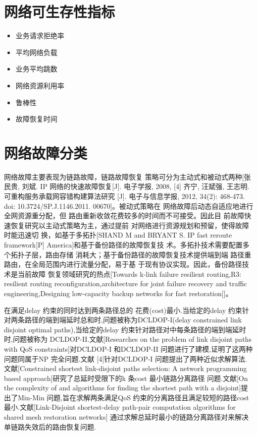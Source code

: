 \section{网络可生存性指标}
\begin{itemize}
  \item 业务请求拒绝率
  \item 平均网络负载
  \item 业务平均跳数
  \item 网络资源利用率
  \item 鲁棒性
  \item 故障恢复时间
\end{itemize}

\section{网络故障分类}
网络故障主要表现为链路故障，链路故障恢复
策略可分为主动式和被动式两种[张民贵, 刘斌. IP 网络的快速故障恢复[J]. 电子学报, 2008,
[4] 齐宁, 汪斌强, 王志明. 可重构服务承载网容错构建算法研究
[J]. 电子与信息学报, 2012, 34(2): 468-473. doi:
10.3724/SP.J.1146.2011. 00670]。被动式策略在
网络故障后动态自适应地进行全网资源重分配，但
路由重新收敛花费较多的时间而不可接受。因此目
前故障快速恢复研究以主动式策略为主，通过提前
对网络进行资源规划和预留，使得故障时能迅速切
换，如基于多拓扑[SHAND M and BRYANT S. IP fast reroute framework[P]
America]和基于备份路径的故障恢复技
术。多拓扑技术需要配置多个拓扑子层，路由存储
消耗大；基于备份路径的故障恢复技术提供端到端
路径重路由，在全局范围内进行流量分配，易于基
于现有协议实现。因此，备份路径技术是当前故障
恢复领域研究的热点[Towards k-link failure resilient routing,R3: resilient
routing reconfiguration,architecture for joint failure recovery and traffic
engineering,Designing low-capacity backup
networks for fast restoration[]。

在满足delay 约束的同时达到两条路径总的
花费(cost)最小.当给定的delay 约束针对两条路径的端到端延时总和时,问题被称为DCLDOP-I(delay
constrained link disjoint optimal paths),当给定的delay 约束针对路径对中每条路径的端到端延时时,问题被称为
DCLDOP-II.文献[Researches on the problem of link disjoint paths with QoS constraints]对DCLDOP-I 和DCLDOP-II 问题进行了建模,证明了这两种问题同属于NP 完全问题.文献
[4]针对DCLDOP-I 问题提出了两种近似求解算法.文献[Constrained shortest link-disjoint paths selection: A network programming based approach]研究了总延时受限下的k 条cost 最小链路分离路径
问题.文献[On the complexity of and algorithms for finding the shortest path with a disjoint]提出了Min-Min 问题,旨在求解两条满足QoS 约束的分离路径且满足较短的路径cost 最小.文献[Link-Disjoint shortest-delay path-pair computation algorithms for shared mesh restoration networks]
通过求解总延时最小的链路分离路径对来解决单链路失效后的路由恢复问题.
